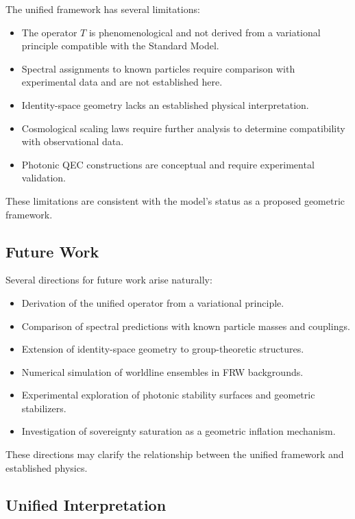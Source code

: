 \documentclass[aip,jmp,reprint,onecolumn,nofootinbib]{revtex4-2}
\begin{document}
The unified framework has several limitations:

\begin{itemize}
\item The operator $T$ is phenomenological and not derived from a variational principle 
compatible with the Standard Model.
\item Spectral assignments to known particles require comparison with experimental data 
and are not established here.
\item Identity-space geometry lacks an established physical interpretation.
\item Cosmological scaling laws require further analysis to determine compatibility with 
observational data.
\item Photonic QEC constructions are conceptual and require experimental validation.
\end{itemize}

These limitations are consistent with the model’s status as a proposed geometric framework.

\subsection{Future Work}

Several directions for future work arise naturally:

\begin{itemize}
\item Derivation of the unified operator from a variational principle.
\item Comparison of spectral predictions with known particle masses and couplings.
\item Extension of identity-space geometry to group-theoretic structures.
\item Numerical simulation of worldline ensembles in FRW backgrounds.
\item Experimental exploration of photonic stability surfaces and geometric stabilizers.
\item Investigation of sovereignty saturation as a geometric inflation mechanism.
\end{itemize}

These directions may clarify the relationship between the unified framework and established 
physics.

\subsection{Unified Interpretation}
\end{document}
